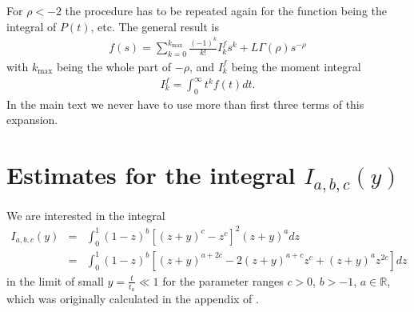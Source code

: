 For $\rho < -2$ the procedure has to be repeated again for the function being the integral of $P(t)$, etc. The general result is
%
\begin{align}
 f(s) = \sum_{k=0}^{k_{\max}} \frac{(-1)^k}{k!} I^{f}_k s^k + L \Gamma(\rho) s^{-\rho}
\end{align}
%
with $k_{\max}$ being the whole part of $-\rho$, and $I^{f}_k$ being the moment integral
\begin{align}
I^{f}_k = \int_0^\infty t^k f(t) dt.
\end{align}
In the main text we never have to use more than first three terms of this expansion. 


\chapter{Estimates for the integral $I_{a,b,c}(y)$ } 
\label{sec:integral}

We are interested in the integral 
%
\begin{eqnarray}
I_{a,b,c}(y) &=& \int^{1}_0 (1-z)^{b} [(z+y)^c-z^c]^2 (z+y)^{a}  dz \label{eqn:Iabc1} \\ 
&=& \int^{1}_0 (1-z)^{b} \left[ (z+y)^{a+2c} -2 (z+y)^{a+c} z^{c}  + (z+y)^{a} z^{2c}\right] dz \nonumber 
\end{eqnarray}
%
in the limit of small $y= \frac{t}{t_a} \ll 1$ for the parameter ranges $c > 0$, $b > -1$, $a \in \mathbb{R}$, which was originally calculated in the appendix of \cite{bothe}.

